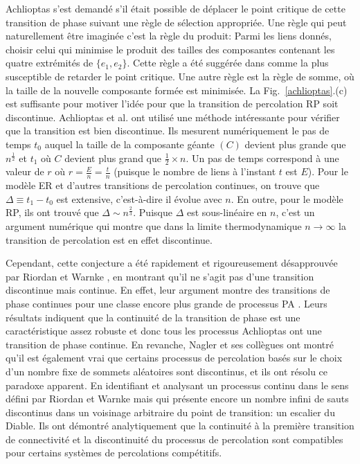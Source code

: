 Achlioptas s'est demandé s'il était possible de déplacer le point critique de cette transition de phase suivant une règle de sélection appropriée. Une règle qui peut naturellement être imaginée c'est la règle du produit: Parmi les liens donnés, choisir celui qui minimise le produit des tailles des composantes contenant les quatre extrémités de $\{e_1,e_2\}$. Cette règle a été suggérée dans \cite{Bollobas-1984} comme la plus susceptible de retarder le point critique. Une autre règle est la règle de somme, où la taille de la nouvelle composante formée est minimisée. La Fig.~\ref{achlioptas}.(c) est  suffisante pour motiver l'idée pour que la transition de percolation RP soit discontinue. Achlioptas et al. ont utilisé une méthode intéressante pour vérifier que la transition est bien discontinue. Ils mesurent numériquement le pas de temps $t_0$ auquel la taille de la composante géante $(C)$ devient plus grande que $n^{\frac{1}{2}}$ et $t_1$ où $C$ devient plus grand que $\frac{1}{2}\times n$. Un pas de temps correspond à une valeur de $r$ où $r=\frac{E}{n}=\frac{t}{n}$ (puisque le nombre de liens à l'instant $t$ est $E$). Pour le modèle ER et d'autres transitions de percolation continues, on trouve que $\Delta\equiv t_1-t_0$ est extensive, c'est-à-dire il évolue avec $n$. En outre, pour le modèle RP, ils ont trouvé que $\Delta\sim n^{\frac{2}{3}}$. Puisque $\Delta$ est sous-linéaire en $n$, c'est un argument numérique qui montre que dans la limite thermodynamique $n\rightarrow \infty$ la transition de percolation est en effet discontinue.

Cependant, cette conjecture a été rapidement et  rigoureusement désapprouvée par Riordan et Warnke \cite{Riordan-Warnke2011,Riordan-Warnke2012}, en montrant qu'il ne s'agit pas d'une transition discontinue  mais continue. En effet, leur argument montre des transitions de phase continues pour une classe encore plus grande de processus PA \cite{Riordan-Warnke2012}. Leurs résultats indiquent que la continuité de la transition de phase est une caractéristique assez robuste et donc tous les processus Achlioptas ont une transition de phase continue. En revanche, Nagler et ses collègues \cite{Nagler-al2012} ont montré qu'il est également vrai que certains processus de percolation basés sur le choix d'un nombre fixe de sommets aléatoires sont discontinus, et ils ont résolu ce paradoxe apparent. En identifiant et analysant un processus  continu dans le sens défini par Riordan et Warnke \cite{Riordan-Warnke2012} mais qui présente encore un nombre infini de sauts discontinus dans un voisinage arbitraire du point de transition: un escalier du Diable. Ils ont démontré analytiquement que la continuité à la première transition de connectivité et la discontinuité du processus de percolation sont compatibles pour certains systèmes de percolations compétitifs.\\

